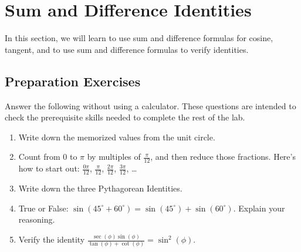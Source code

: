 
\section{Sum and Difference Identities} \label{section-sum-and-difference-identities}
In this section, we will learn to use sum and difference formulas for cosine, tangent, and to use sum and difference formulas to verify identities.


\subsection*{Preparation Exercises} \label{preparation-exercises-section-sum-and-difference-identities}

\begin{myPrep}
Answer the following without using a calculator. These questions are intended to check the prerequisite skills needed to complete the rest of the lab.
	\begin{enumerate}
		\item Write down the memorized values from the unit circle.
			\begin{enumerate}[itemsep=5mm]
			\end{enumerate}
			\vfill
		\item Count from $0$ to $\pi$ by multiples of $\frac{\pi}{12}$, and then reduce those fractions. Here's how to start out: $\frac{0\pi}{12}$, $\frac{\pi}{12}$, $\frac{2\pi}{12}$, $\frac{3\pi}{12}$, \ldots
		\vfill
		\item Write down the three Pythagorean Identities.
		\vfill
		\item True or False: $\sin(45^\circ+60^\circ)=\sin(45^\circ)+\sin(60^\circ)$. Explain your reasoning.
		\vfill
		\item Verify the identity $\frac{\sec(\phi)\sin(\phi)}{\tan(\phi)+\cot(\phi)}=\sin^2(\phi)$.
		\vfill
	\end{enumerate}
\end{myPrep}
\vfill

